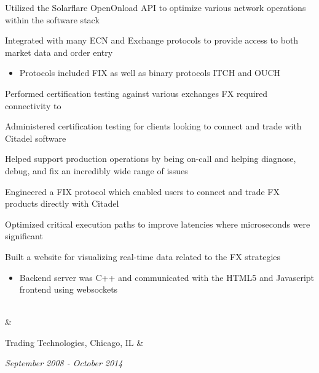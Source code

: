 \documentclass{report}
\newcommand{\contenttext}       {
                                 \fontencoding{T1}
                                 \fontfamily{cmss}
                                 \fontseries{m}
                                 \fontsize{9}{9}
                                 \selectfont
                                }
\newcommand{\timelinedescloc}[2]{\contenttext\textcolor{emphcolor}{#1}, #2}
\newcommand{\timelinedates}[2]  {\contenttext\emph{#1 - #2}}
\begin{document}
\begin{table}
\begin{tabular}
{                         \item Utilized the Solarflare OpenOnload API to optimize various network
                               operations within the software stack
                         \item Integrated with many ECN and Exchange protocols to provide access
                               to both market data and order entry
                               \begin{itemize}
                                    \item Protocols included FIX as well as binary protocols ITCH
                                          and OUCH
                               \end{itemize}
                         \item Performed certification testing against various exchanges FX required
                               connectivity to
                         \item Administered certification testing for clients looking to connect
                               and trade with Citadel software
                         \item Helped support production operations by being on-call and helping
                               diagnose, debug, and fix an incredibly wide range of issues
                         \item Engineered a FIX protocol which enabled users to connect and trade
                               FX products directly with Citadel
                         \item Optimized critical execution paths to improve latencies where
                               microseconds were significant
                         \item Built a website for visualizing real-time data related to the
                               FX strategies
                               \begin{itemize}
                                   \item Backend server was C++ and communicated with the HTML5
                                         and Javascript frontend using websockets
                               \end{itemize}
                        } \\

        &
        \timelinedescloc{Trading Technologies}{Chicago, IL} &
        \timelinedates{September 2008}{October 2014} \\


\end{tabular}
\end{table}
\end{document}
